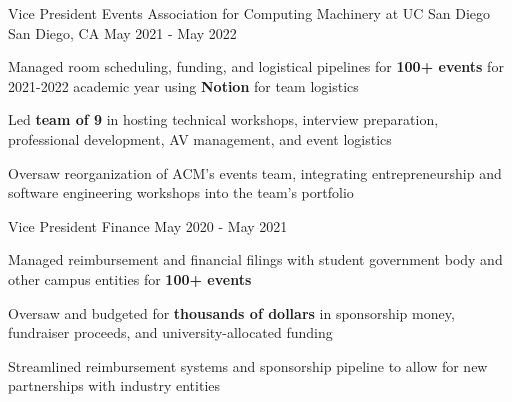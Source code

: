 \begin{cventries}
  \cventrytwo
    {Vice President Events} %
    {Association for Computing Machinery at UC San Diego} %
    {San Diego, CA} %
    {May 2021 - May 2022} %
    {
      \begin{cvitems} %
        \item {Managed room scheduling, funding, and logistical pipelines for \textbf{100+ events} for 2021-2022 academic year using \textbf{Notion} for team logistics}
        \item {Led \textbf{team of 9} in hosting technical workshops, interview preparation, professional development, AV management, and event logistics}
        \item {Oversaw reorganization of ACM's events team, integrating entrepreneurship and software engineering workshops into the team's portfolio}
      \end{cvitems}
    }
    {Vice President Finance}
    {May 2020 - May 2021} %
    {
      \begin{cvitems} %
        \item {Managed reimbursement and financial filings with student government body and other campus entities for \textbf{100+ events}}
        \item {Oversaw and budgeted for \textbf{thousands of dollars} in sponsorship money, fundraiser proceeds, and university-allocated funding}
        \item {Streamlined reimbursement systems and sponsorship pipeline to allow for new partnerships with industry entities}
      \end{cvitems}
    }


\end{cventries}
